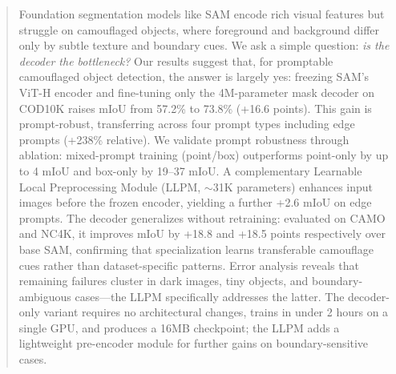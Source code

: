 \begin{abstract}
Foundation segmentation models like SAM encode rich visual features but struggle on camouflaged objects, where foreground and background differ only by subtle texture and boundary cues.
We ask a simple question: \emph{is the decoder the bottleneck?} Our results suggest that, for promptable camouflaged object detection, the answer is largely yes: freezing SAM's ViT-H encoder and fine-tuning only the 4M-parameter mask decoder on COD10K raises mIoU from 57.2\% to 73.8\% (+16.6 points).
This gain is prompt-robust, transferring across four prompt types including edge prompts (+238\% relative).
We validate prompt robustness through ablation: mixed-prompt training (point/box) outperforms point-only by up to 4 mIoU and box-only by 19--37 mIoU.
A complementary Learnable Local Preprocessing Module (LLPM, $\sim$31K parameters) enhances input images before the frozen encoder, yielding a further +2.6 mIoU on edge prompts.
The decoder generalizes without retraining: evaluated on CAMO and NC4K, it improves mIoU by +18.8 and +18.5 points respectively over base SAM, confirming that specialization learns transferable camouflage cues rather than dataset-specific patterns.
Error analysis reveals that remaining failures cluster in dark images, tiny objects, and boundary-ambiguous cases---the LLPM specifically addresses the latter.
The decoder-only variant requires no architectural changes, trains in under 2 hours on a single GPU, and produces a 16MB checkpoint; the LLPM adds a lightweight pre-encoder module for further gains on boundary-sensitive cases.
\end{abstract}
